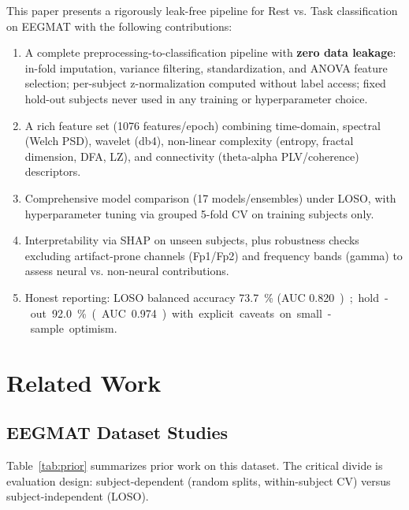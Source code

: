 \documentclass[conference]{IEEEtran}
\begin{document}
This paper presents a rigorously leak-free pipeline for Rest vs. Task classification on EEGMAT with the following contributions:
\begin{enumerate}
    \item A complete preprocessing-to-classification pipeline with \textbf{zero data leakage}: in-fold imputation, variance filtering, standardization, and ANOVA feature selection; per-subject z-normalization computed without label access; fixed hold-out subjects never used in any training or hyperparameter choice.
    \item A rich feature set (\num{1076} features/epoch) combining time-domain, spectral (Welch PSD), wavelet (db4), non-linear complexity (entropy, fractal dimension, DFA, LZ), and connectivity (theta-alpha PLV/coherence) descriptors.
    \item Comprehensive model comparison (\num{17} models/ensembles) under LOSO, with hyperparameter tuning via grouped 5-fold CV on training subjects only.
    \item Interpretability via SHAP on unseen subjects, plus robustness checks excluding artifact-prone channels (Fp1/Fp2) and frequency bands (gamma) to assess neural vs. non-neural contributions.
    \item Honest reporting: LOSO balanced accuracy \SI{73.7}{\%} (AUC \SI{0.820}); hold-out \SI{92.0}{\%} (AUC \SI{0.974}) with explicit caveats on small-sample optimism.
\end{enumerate}

\section{Related Work}
\label{sec:related}

\subsection{EEGMAT Dataset Studies}
Table~\ref{tab:prior} summarizes prior work on this dataset. The critical divide is evaluation design: subject-dependent (random splits, within-subject CV) versus subject-independent (LOSO).
\end{document}
